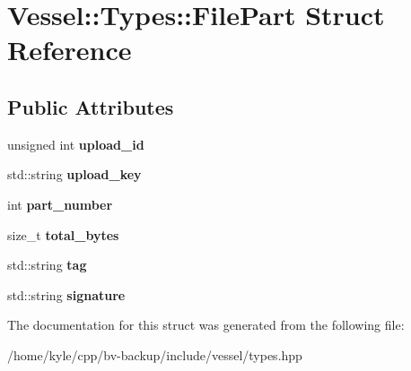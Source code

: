 \hypertarget{struct_vessel_1_1_types_1_1_file_part}{}\section{Vessel\+:\+:Types\+:\+:File\+Part Struct Reference}
\label{struct_vessel_1_1_types_1_1_file_part}
\subsection*{Public Attributes}
\begin{DoxyCompactItemize}
\item 
\mbox{\label{struct_vessel_1_1_types_1_1_file_part_afd739fe0596eec0e6f42a46678f6b67d}} 
unsigned int {\bfseries upload\+\_\+id}
\item 
\mbox{\label{struct_vessel_1_1_types_1_1_file_part_a99193b637fe6c86582b7f39142090de1}} 
std\+::string {\bfseries upload\+\_\+key}
\item 
\mbox{\label{struct_vessel_1_1_types_1_1_file_part_a27ef31c339bd6195a1ea3f5137f600b4}} 
int {\bfseries part\+\_\+number}
\item 
\mbox{\label{struct_vessel_1_1_types_1_1_file_part_a830f548fb98c9dd10e1e8bf92149d974}} 
size\+\_\+t {\bfseries total\+\_\+bytes}
\item 
\mbox{\label{struct_vessel_1_1_types_1_1_file_part_ad6e9dc2a3bf167ff5cbce4b6328b1bf9}} 
std\+::string {\bfseries tag}
\item 
\mbox{\label{struct_vessel_1_1_types_1_1_file_part_ab317c93b6922952bcc834179e5df7f6f}} 
std\+::string {\bfseries signature}
\end{DoxyCompactItemize}


The documentation for this struct was generated from the following file\+:\begin{DoxyCompactItemize}
\item 
/home/kyle/cpp/bv-\/backup/include/vessel/types.\+hpp\end{DoxyCompactItemize}
